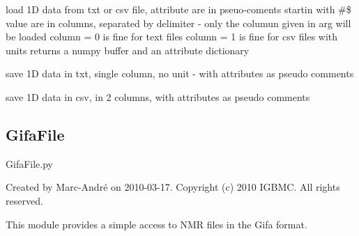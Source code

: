 \documentclass[letterpaper,10pt,openany,oneside]{sphinxmanual}
\begin{document}

\begin{fulllineitems}
\label{rst/code:File.csv.load}
load 1D data from txt or csv file,
attribute are in pseuo-coments startin with \#\$
value are in columns, separated by delimiter - only the columun given in arg will be loaded
column = 0 is fine for text files
column = 1 is fine for csv files with units
returns a numpy buffer and an attribute dictionary

\end{fulllineitems}


\begin{fulllineitems}
\label{rst/code:File.csv.save}
save 1D data in txt, single column, no unit - with attributes as pseudo comments

\end{fulllineitems}


\begin{fulllineitems}
\label{rst/code:File.csv.save_unit}
save 1D data in csv,
in 2 columns, with attributes as pseudo comments

\end{fulllineitems}



\subsection{GifaFile}
\label{rst/code:gifafile}\label{rst/code:module-File.GifaFile}
GifaFile.py

Created by Marc-André on 2010-03-17.
Copyright (c) 2010 IGBMC. All rights reserved.

This module provides a simple access to NMR files in the Gifa format.
\end{document}

